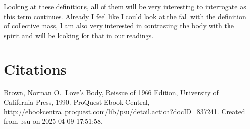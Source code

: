 \documentclass{article}
\begin{document}
Looking at these definitions, all of them will be very interesting to interrogate as this term continues. Already I feel like I could look at the fall with the definition of collective mass, I am also very interested in contrasting the body with the spirit and will be looking for that in our readings.\\

\section{Citations}

Brown, Norman O.. Love's Body, Reissue of 1966 Edition, University of California Press, 1990. ProQuest Ebook Central, \url{http://ebookcentral.proquest.com/lib/psu/detail.action?docID=837241}.
Created from psu on 2025-04-09 17:51:58. 
\end{document}
